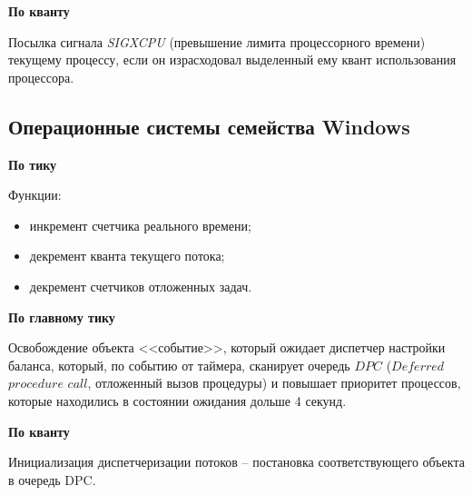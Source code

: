 \textbf{По кванту}

Посылка сигнала \textit{SIGXCPU} (превышение лимита процессорного времени) текущему процессу, если он израсходовал выделенный ему квант использования процессора.

\subsection{Операционные системы семейства Windows}

\textbf{По тику}

Функции:
\begin{itemize}
	\item инкремент счетчика реального времени;
	\item декремент кванта текущего потока;
	\item декремент счетчиков отложенных задач.
\end{itemize}

\textbf{По главному тику}

Освобождение объекта <<событие>>, который ожидает диспетчер настройки баланса, который, по событию от таймера, сканирует очередь $DPC$ ($Deferred$ $procedure$ $call$, отложенный вызов процедуры) и повышает приоритет процессов, которые находились в состоянии ожидания дольше 4 секунд.

\textbf{По кванту}

Инициализация диспетчеризации потоков -- постановка соответствующего объекта в очередь DPC.
